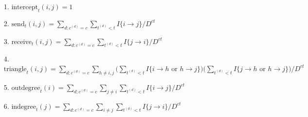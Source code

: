 \documentclass[a4paper]{article}
\begin{document}
 \begin{itemize}
 	\item [1.] $\mbox{intercept}_t(i, j) = 1$
 	\item [2.]  $\mbox{send}_t(i, j)=\sum\limits_{d: c^{(d)}=c}\sum\limits_{t^{(d)}<t} I\{i\rightarrow j\}/D^{ct}$
 	\item [3.] $\mbox{receive}_t(i, j)=\sum\limits_{d: c^{(d)}=c}\sum\limits_{t^{(d)}<t} I\{j\rightarrow i\}/D^{ct}$
 	\item [4.] $\mbox{triangle}_t(i, j)=\sum\limits_{d: c^{(d)}=c}\sum\limits_{h \neq i, j}\Big(\sum\limits_{t^{(d)}<t}  I\{i\rightarrow h \mbox{ or } h\rightarrow j \}\Big)\Big(\sum\limits_{t^{(d)}<t} I\{j\rightarrow h \mbox{ or } h\rightarrow j\}\Big)/D^{ct}$
 	\item [5.]  $\mbox{outdegree}_t(i)=\sum\limits_{d: c^{(d)}=c}\sum\limits_{j\neq i}\sum\limits_{t^{(d)}<t} I\{i\rightarrow j\}/D^{ct}$
 	\item [6.] $\mbox{indegree}_t(j)=\sum\limits_{d: c^{(d)}=c}\sum\limits_{i \neq j}\sum\limits_{t^{(d)}<t} I\{j\rightarrow i\}/D^{ct}$
 \end{itemize}
\end{document}
